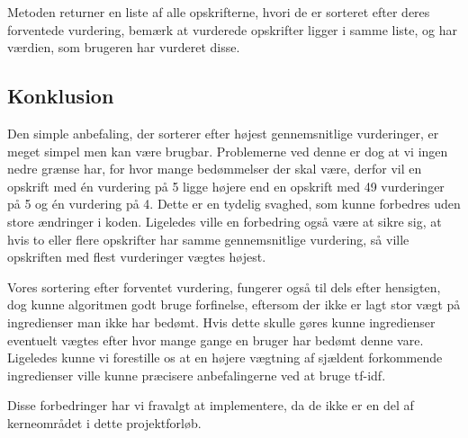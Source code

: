 Metoden returner en liste af alle opskrifterne, hvori de er sorteret efter deres forventede vurdering, bemærk at vurderede opskrifter ligger i samme liste, og har værdien, som brugeren har vurderet disse.

\subsection{Konklusion}
Den simple anbefaling, der sorterer efter højest gennemsnitlige vurderinger, er meget simpel men kan være brugbar.
Problemerne ved denne er dog at vi ingen nedre grænse har, for hvor mange bedømmelser der skal være, derfor vil en opskrift med én vurdering på 5 ligge højere end en opskrift med 49 vurderinger på 5 og én vurdering på 4.
Dette er en tydelig svaghed, som kunne forbedres uden store ændringer i koden.
Ligeledes ville en forbedring også være at sikre sig, at hvis to eller flere opskrifter har samme gennemsnitlige vurdering, så ville opskriften med flest vurderinger vægtes højest.

Vores sortering efter forventet vurdering, fungerer også til dels efter hensigten, dog kunne algoritmen godt bruge forfinelse, eftersom der ikke er lagt stor vægt på ingredienser man ikke har bedømt.
Hvis dette skulle gøres kunne ingredienser eventuelt vægtes efter hvor mange gange en bruger har bedømt denne vare.
Ligeledes kunne vi forestille os at en højere vægtning af sjældent forkommende ingredienser ville kunne præcisere anbefalingerne ved at bruge tf-idf.

Disse forbedringer har vi fravalgt at implementere, da de ikke er en del af kerneområdet i dette projektforløb.
